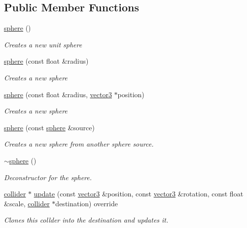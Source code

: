 \subsection*{Public Member Functions}
\begin{DoxyCompactItemize}
\item 
\hyperlink{classflounder_1_1sphere_a99e656a77996015079eb9744db5d7330}{sphere} ()
\begin{DoxyCompactList}\small\item\em Creates a new unit sphere \end{DoxyCompactList}\item 
\hyperlink{classflounder_1_1sphere_ad6598fc632cabc8a516cef89f1f0cae9}{sphere} (const float \&radius)
\begin{DoxyCompactList}\small\item\em Creates a new sphere \end{DoxyCompactList}\item 
\hyperlink{classflounder_1_1sphere_a760cbc4b1b1dc51e47813b4c0d0b489d}{sphere} (const float \&radius, \hyperlink{classflounder_1_1vector3}{vector3} $\ast$position)
\begin{DoxyCompactList}\small\item\em Creates a new sphere \end{DoxyCompactList}\item 
\hyperlink{classflounder_1_1sphere_aa1ae44ea868f8884908eec5f6250032e}{sphere} (const \hyperlink{classflounder_1_1sphere}{sphere} \&source)
\begin{DoxyCompactList}\small\item\em Creates a new sphere from another sphere source. \end{DoxyCompactList}\item 
\hyperlink{classflounder_1_1sphere_ab6f5bcdd6c9f36e582aab2e267b1abcf}{$\sim$sphere} ()
\begin{DoxyCompactList}\small\item\em Deconstructor for the sphere. \end{DoxyCompactList}\item 
\hyperlink{classflounder_1_1collider}{collider} $\ast$ \hyperlink{classflounder_1_1sphere_adc8035d65ddea47c5c79b77d8403e11b}{update} (const \hyperlink{classflounder_1_1vector3}{vector3} \&position, const \hyperlink{classflounder_1_1vector3}{vector3} \&rotation, const float \&scale, \hyperlink{classflounder_1_1collider}{collider} $\ast$destination) override
\begin{DoxyCompactList}\small\item\em Clones this collder into the destination and updates it. \end{DoxyCompactList}\item 

\end{DoxyCompactItemize}
